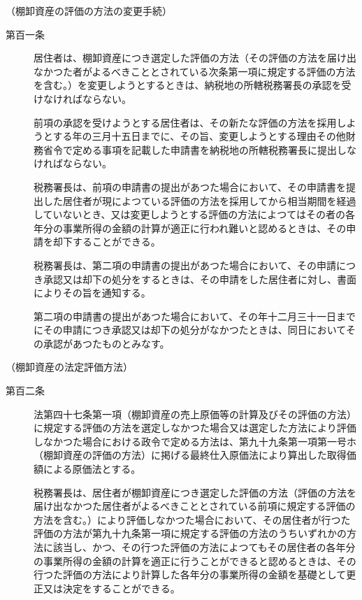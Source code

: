 \documentclass[twocolumn,a4j,10pt]{ltjtarticle}
\begin{document}
\noindent\hspace{10pt}（棚卸資産の評価の方法の変更手続）
\begin{description}
\item[第百一条]居住者は、棚卸資産につき選定した評価の方法（その評価の方法を届け出なかつた者がよるべきこととされている次条第一項に規定する評価の方法を含む。）を変更しようとするときは、納税地の所轄税務署長の承認を受けなければならない。
\item[]前項の承認を受けようとする居住者は、その新たな評価の方法を採用しようとする年の三月十五日までに、その旨、変更しようとする理由その他財務省令で定める事項を記載した申請書を納税地の所轄税務署長に提出しなければならない。
\item[]税務署長は、前項の申請書の提出があつた場合において、その申請書を提出した居住者が現によつている評価の方法を採用してから相当期間を経過していないとき、又は変更しようとする評価の方法によつてはその者の各年分の事業所得の金額の計算が適正に行われ難いと認めるときは、その申請を却下することができる。
\item[]税務署長は、第二項の申請書の提出があつた場合において、その申請につき承認又は却下の処分をするときは、その申請をした居住者に対し、書面によりその旨を通知する。
\item[]第二項の申請書の提出があつた場合において、その年十二月三十一日までにその申請につき承認又は却下の処分がなかつたときは、同日においてその承認があつたものとみなす。
\end{description}
\noindent\hspace{10pt}（棚卸資産の法定評価方法）
\begin{description}
\item[第百二条]法第四十七条第一項（棚卸資産の売上原価等の計算及びその評価の方法）に規定する評価の方法を選定しなかつた場合又は選定した方法により評価しなかつた場合における政令で定める方法は、第九十九条第一項第一号ホ（棚卸資産の評価の方法）に掲げる最終仕入原価法により算出した取得価額による原価法とする。
\item[]税務署長は、居住者が棚卸資産につき選定した評価の方法（評価の方法を届け出なかつた居住者がよるべきこととされている前項に規定する評価の方法を含む。）により評価しなかつた場合において、その居住者が行つた評価の方法が第九十九条第一項に規定する評価の方法のうちいずれかの方法に該当し、かつ、その行つた評価の方法によつてもその居住者の各年分の事業所得の金額の計算を適正に行うことができると認めるときは、その行つた評価の方法により計算した各年分の事業所得の金額を基礎として更正又は決定をすることができる。
\end{description}
\end{document}
